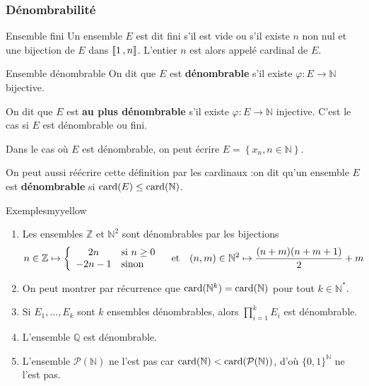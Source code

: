     \subsubsection{Dénombrabilité}

    \begin{defi}{Ensemble fini}{}
        Un ensemble $E$ est dit fini s’il est vide ou s’il existe $n$ non nul et une bijection de $E$ dans $\left\llbracket 1 \, , n \right\rrbracket$. L’entier $n$ est alors appelé cardinal de $E$.
    \end{defi}

    \begin{defi}{Ensemble dénombrable}{}
        On dit que $E$ est \textbf{dénombrable} s’il existe $\varphi : E \to \mathbb{N}$ bijective.

        On dit que $E$ est \textbf{au plus dénombrable} s’il existe $\varphi : E \to \mathbb{N}$ injective. C’est le cas si $E$ est dénombrable ou fini.

        Dans le cas où $E$ est dénombrable, on peut écrire $E = \left\{x_n , n \in \mathbb{N}\right\}$.
    \end{defi}

    On peut aussi réécrire cette définition par les cardinaux :on dit qu’un ensemble $E$ est \textbf{dénombrable} si $\operatorname{card}(E) \leq \operatorname{card}(\mathbb{N})$.

    \begin{omed}{Exemples}{myyellow}
        \begin{enumerate}[label=\textcolor{myyellow}{(\arabic*)}]
            \item Les ensembles $\mathbb{Z}$ et $\mathbb{N}^2$ sont dénombrables par les bijections 
            \[ n \in \mathbb{Z} \mapsto \sisinon{2n}{n \geq 0}{-2n-1} \esp{et} (n,m) \in \mathbb{N}^2 \mapsto \frac{(n+m)(n+m+1)}{2} + m \]
            \item On peut montrer par récurrence que $\operatorname{card}(\mathbb{N}^k) = \operatorname{card}(\mathbb{N})$ pour tout $k \in \mathbb{N}^*$.
            \item Si $E_1,\ldots,E_k$ sont $k$ ensembles dénombrables, alors $\prod_{i=1}^{k} E_i$ est dénombrable.
            \item L’ensemble $\mathbb{Q}$ est dénombrable.
            \item L’ensemble $\mathcal{P}(\mathbb{N})$ ne l’est pas car $\operatorname{card}(\mathbb{N}) < \operatorname{card}(\mathcal{P}(\mathbb{N}))$, d’où $\big\{ 0,1 \big\}^{\mathbb{N}}$ ne l’est pas.
        \end{enumerate}
    \end{omed}

